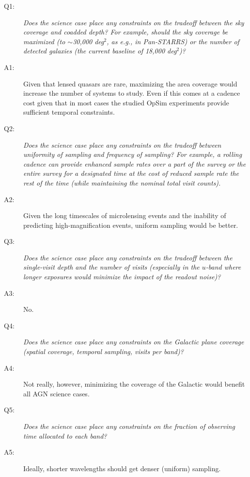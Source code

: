 \begin{description}

\item[Q1:] {\it Does the science case place any constraints on the
tradeoff between the sky coverage and coadded depth? For example, should
the sky coverage be maximized (to $\sim$30,000 deg$^2$, as e.g., in
Pan-STARRS) or the number of detected galaxies (the current baseline 
of 18,000 deg$^2$)?}

\item[A1:] Given that lensed quasars are rare, maximizing the area
coverage would increase the number of systems to study. Even if this
comes at a cadence cost given that in most cases the studied OpSim
experiments provide sufficient temporal constraints.

\item[Q2:] {\it Does the science case place any constraints on the
tradeoff between uniformity of sampling and frequency of  sampling? For
example, a rolling cadence can provide enhanced sample rates over a part
of the survey or the entire survey for a designated time at the cost of
reduced sample rate the rest of the time (while maintaining the nominal
total visit counts).}

\item[A2:] Given the long timescales of microlensing events and the inability of predicting high-magnification events, uniform sampling would be better.

\item[Q3:] {\it Does the science case place any constraints on the
tradeoff between the single-visit depth and the number of visits
(especially in the $u$-band where longer exposures would minimize the
impact of the readout noise)?}

\item[A3:] No.

\item[Q4:] {\it Does the science case place any constraints on the
Galactic plane coverage (spatial coverage, temporal sampling, visits per
band)?}

\item[A4:] Not really, however, minimizing the coverage of the Galactic would benefit all AGN science cases.

\item[Q5:] {\it Does the science case place any constraints on the
fraction of observing time allocated to each band?}

\item[A5:] Ideally, shorter wavelengths should get denser (uniform) sampling.


\end{description}
